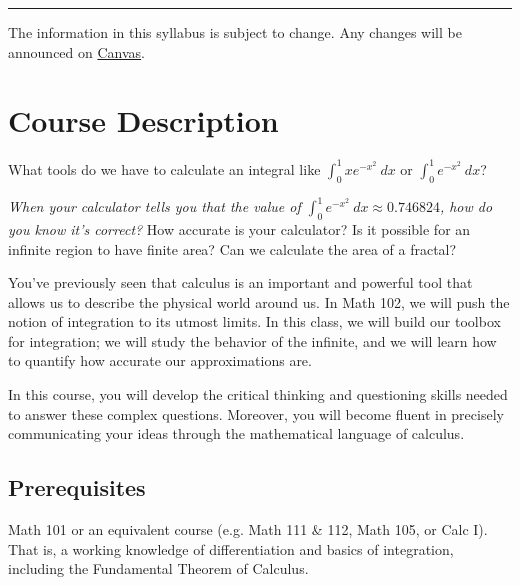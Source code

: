 \documentclass[11pt]{article}
\newcommand{\coursewebsite}[1]{\href{https://canvas.rice.edu/courses/85598}{#1}}
\begin{document}
\noindent\rule{\textwidth}{1pt}


\begin{center}
    The information in this syllabus is subject to change. Any changes will be announced on \coursewebsite{Canvas}.
\end{center}



\newpage



\section{Course Description}
What tools do we have to calculate an integral like $\displaystyle \int_0^1 xe^{-x^2} \ dx$ or $\displaystyle\int_0^1 e^{-x^2} \ dx$?

\vspace{.5em}

\emph{When your calculator tells you that the value of $\displaystyle \int_0^1 e^{-x^2} \ dx \approx 0.746824$, how do you know it's correct?} How accurate is your calculator?   Is it possible for an infinite region to have finite area?  Can we calculate the area of a fractal?

You've previously seen that calculus is an important and powerful tool that allows us to describe the physical world around us.  In Math 102, we will push the notion of integration to its utmost limits.  In this class, we will build our toolbox for integration; we will study the behavior of the infinite, and we will learn how to quantify how accurate our approximations are.


In this course, you will develop the critical thinking and questioning skills needed to answer these complex questions.  Moreover, you will become fluent in precisely communicating your ideas through the mathematical language of calculus.





\subsection*{Prerequisites}%
Math 101 or an equivalent course (e.g. Math 111 \& 112, Math 105, or Calc I). That is, a working knowledge of differentiation and basics of integration, including the Fundamental Theorem of Calculus. 
\end{document}
